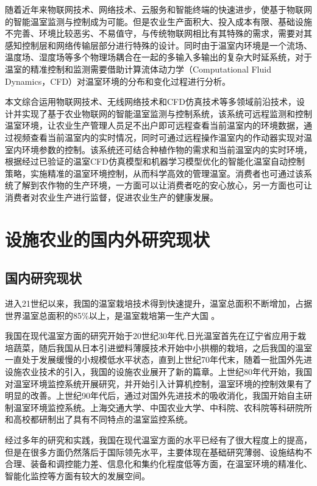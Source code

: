 随着近年来物联网技术、网络技术、云服务和智能终端的快速进步，使基于物联网的智能温室监测与控制成为可能。但是农业生产面积大、投入成本有限、基础设施不完善、环境比较恶劣、不易值守，与传统物联网相比有其特殊的需求，需要对其感知控制层和网络传输层部分进行特殊的设计。同时由于温室内环境是一个流场、温度场、湿度场等多个物理场耦合在一起的多输入多输出的复杂大时延系统，对于温室的精准控制和监测需要借助计算流体动力学（Computational Fluid Dynamics，CFD）对温室环境的分布和变化过程进行分析。

本文综合运用物联网技术、无线网络技术和CFD仿真技术等多领域前沿技术，设计并实现了基于农业物联网的智能温室监测与控制系统，该系统可远程监测和控制温室环境，让农业生产管理人员足不出户即可远程查看当前温室内的环境数据，通过视频查看当前温室内的实时情况，同时可通过远程操作温室内的作动器实现对温室内环境参数的控制。该系统还可结合种植作物的需求和当前温室内的实时环境，根据经过已验证的温室CFD仿真模型和机器学习模型优化的智能化温室自动控制策略，实施精准的温室环境控制，从而科学高效的管理温室。消费者也可通过该系统了解到农作物的生产环境，一方面可以让消费者吃的安心放心，另一方面也可让消费者对农业生产进行监督，促进农业生产的健康发展。

\section{设施农业的国内外研究现状}
	\subsection{国内研究现状}
进入21世纪以来，我国的温室栽培技术得到快速提升，温室总面积不断增加，占据世界温室总面积的85\%以上，是温室栽培第一生产大国\supercite{GuoShirong2012ZGSC} 。
	
我国在现代温室方面的研究开始于20世纪30年代,日光温室首先在辽宁省应用于栽培蔬菜，随后我国从日本引进塑料薄膜技术开始中小拱棚的栽培，之后我国的温室一直处于发展缓慢的小规模低水平状态，直到上世纪70年代末，随着一批国外先进设施农业技术的引入，我国的设施农业展开了新的篇章\supercite{ZhouChangji2010}。上世纪80年代开始，我国对温室环境监控系统开展研究，并开始引入计算机控制，温室环境的控制效果有了明显的改善\supercite{HanYi2016}。上世纪90年代后，通过对国外先进技术的吸收消化，我国开始自主研制温室环境监控系统。上海交通大学、中国农业大学、中科院、农科院等科研院所和高校都研制出了具有不同特点的温室监控系统。

经过多年的研究和实践，我国在现代温室方面的水平已经有了很大程度上的提高，但是在很多方面仍然落后于国际领先水平，主要体现在基础研究薄弱、设施结构不合理、装备和调控能力差、信息化和集约化程度低等方面\supercite{ZhangZhen2015,JiangWeijie2015}，在温室环境的精准化、智能化监控等方面有较大的发展空间。


